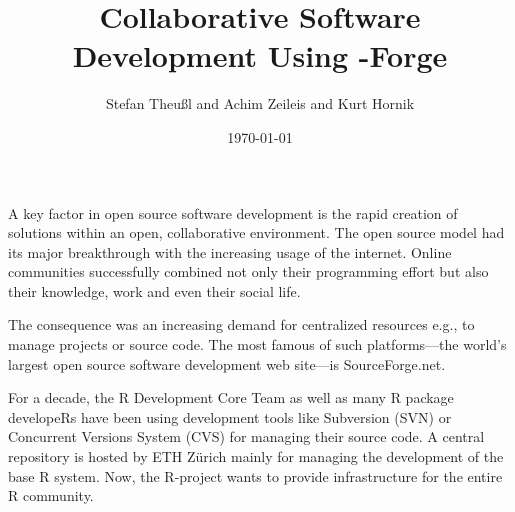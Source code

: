 \documentclass[12pt,a4paper]{article}
\title{Collaborative Software Development Using \proglang{R}-Forge}
\author{Stefan Theu\ss{}l and Achim Zeileis and Kurt Hornik}
\date{\today}
\newcommand{\proglang}[1]{\textsf{#1}}
\begin{document}
\maketitle



A key factor in open source software development is the rapid creation
of solutions within an open, collaborative environment. The open
source model had its major breakthrough with the increasing
usage of the internet. Online communities successfully combined
not only their programming effort but also their knowledge, work
and even their social life.
 
The consequence was an increasing demand for centralized resources e.g.,
to manage projects or source code. The most famous of such
platforms---the world's largest open source
software development web site---is SourceForge.net.

For a decade, the \proglang{R} Development Core Team as well as many
\proglang{R} package developeRs have been using
development tools like Subversion (SVN) or Concurrent Versions System
(CVS) for managing their source
code. A central repository is hosted by ETH Z\"urich mainly for
managing the development of the base \proglang{R} system. Now, the
\proglang{R}-project wants to provide infrastructure for the entire
\proglang{R} community.



\end{document}
